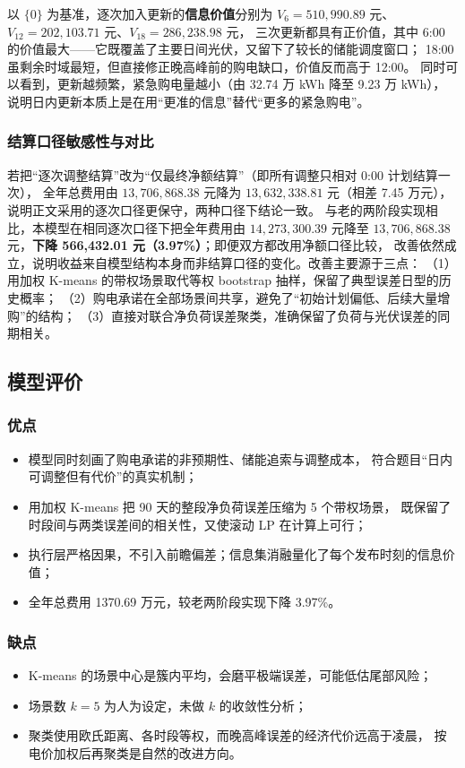 \documentclass[12pt,a4paper]{article}
\begin{document}
以 $\{0\}$ 为基准，逐次加入更新的\textbf{信息价值}分别为
$V_6 = 510{,}990.89$ 元、$V_{12} = 202{,}103.71$ 元、$V_{18} = 286{,}238.98$ 元，
三次更新都具有正价值，其中 6:00 的价值最大——它既覆盖了主要日间光伏，又留下了较长的储能调度窗口；
18:00 虽剩余时域最短，但直接修正晚高峰前的购电缺口，价值反而高于 12:00。
同时可以看到，更新越频繁，紧急购电量越小（由 32.74 万 kWh 降至 9.23 万 kWh），
说明日内更新本质上是在用“更准的信息”替代“更多的紧急购电”。

\subsubsection{结算口径敏感性与对比}

若把“逐次调整结算”改为“仅最终净额结算”（即所有调整只相对 0:00 计划结算一次），
全年总费用由 $13{,}706{,}868.38$ 元降为 $13{,}632{,}338.81$ 元（相差 7.45 万元），
说明正文采用的逐次口径更保守，两种口径下结论一致。
与老的两阶段实现相比，本模型在相同逐次口径下把全年费用由 $14{,}273{,}300.39$ 元降至
$13{,}706{,}868.38$ 元，\textbf{下降 566{,}432.01 元（3.97\%）}；即便双方都改用净额口径比较，
改善依然成立，说明收益来自模型结构本身而非结算口径的变化。改善主要源于三点：
（1）用加权 K-means 的带权场景取代等权 bootstrap 抽样，保留了典型误差日型的历史概率；
（2）购电承诺在全部场景间共享，避免了“初始计划偏低、后续大量增购”的结构；
（3）直接对联合净负荷误差聚类，准确保留了负荷与光伏误差的同期相关。

\subsection{模型评价}

\subsubsection{优点}
\begin{itemize}
    \item 模型同时刻画了购电承诺的非预期性、储能追索与调整成本，
          符合题目“日内可调整但有代价”的真实机制；
    \item 用加权 K-means 把 90 天的整段净负荷误差压缩为 5 个带权场景，
          既保留了时段间与两类误差间的相关性，又使滚动 LP 在计算上可行；
    \item 执行层严格因果，不引入前瞻偏差；信息集消融量化了每个发布时刻的信息价值；
    \item 全年总费用 1370.69 万元，较老两阶段实现下降 3.97\%。
\end{itemize}

\subsubsection{缺点}
\begin{itemize}
    \item K-means 的场景中心是簇内平均，会磨平极端误差，可能低估尾部风险；
    \item 场景数 $k=5$ 为人为设定，未做 $k$ 的收敛性分析；
    \item 聚类使用欧氏距离、各时段等权，而晚高峰误差的经济代价远高于凌晨，
          按电价加权后再聚类是自然的改进方向。
\end{itemize}
\end{document}
